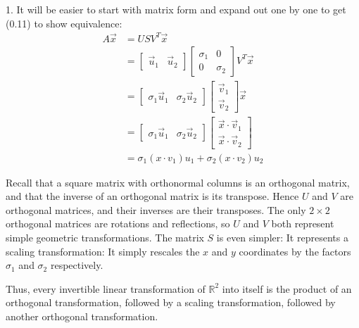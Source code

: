 \documentclass[12pt]{article}
\begin{document}
1. It will be easier to start with matrix form and expand out one by one to get (0.11) to show equivalence:
\begin{align*}
    A\vec{x} & = USV^T\vec{x}                                                                                                                                                \\
             & = \begin{bmatrix} \vec{u}_1 & \vec{u}_2 \end{bmatrix} \begin{bmatrix}       \sigma_{1} & 0 \\ 0 & \sigma_{2}       \end{bmatrix}V^T\vec{x}                    \\
             & = \begin{bmatrix} \sigma_{1}\vec{u}_1 & \sigma_{2}\vec{u}_2\end{bmatrix} \begin{bmatrix} \vec{v}_1 \\ \vec{v}_2 \end{bmatrix}\vec{x}                          \\
             & = \begin{bmatrix} \sigma_{1}\vec{u}_1 & \sigma_{2}\vec{u}_2\end{bmatrix} \begin{bmatrix} \vec{x} \cdot{} \vec{v}_1 \\ \vec{x} \cdot{} \vec{v}_2 \end{bmatrix} \\
             & = \sigma_{1}(x\cdot v_{1})u_{1}+\sigma_{2}(x\cdot v_{2})u_{2} \tag{0.11}
\end{align*}

\hrulefill{}

Recall that a square matrix with orthonormal columns is an orthogonal matrix, and that the inverse of an orthogonal matrix is its transpose. Hence $U$ and $V$ are orthogonal matrices, and their inverses are their transposes. The only $2\times2$ orthogonal matrices are rotations and reflections, so $U$ and $V$ both represent simple geometric transformations. The matrix $S$ is even simpler: It represents a scaling transformation: It simply rescales the $x$ and $y$ coordinates by the factors $\sigma_{1}$ and $\sigma_{2}$ respectively.

Thus, every invertible linear transformation of $\mathbb{R}^{2}$ into itself is the product of an orthogonal transformation, followed by a scaling transformation, followed by another orthogonal transformation.
\end{document}
